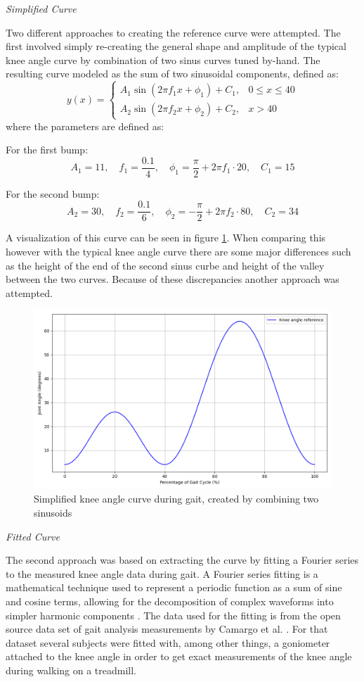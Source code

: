 \textit{Simplified Curve}

Two different approaches to creating the reference curve were attempted. The first involved simply re-creating the general shape and amplitude of the typical knee angle curve by combination of two sinus curves tuned by-hand. The resulting curve modeled as the sum of two sinusoidal components, defined as:
\[
y(x) =
\begin{cases}
A_1 \sin\left(2 \pi f_1 x + \phi_1\right) + C_1, & 0 \leq x \leq 40 \\
A_2 \sin\left(2 \pi f_2 x + \phi_2\right) + C_2, & x > 40
\end{cases}
\]
where the parameters are defined as:

For the first bump:
\[
A_1 = 11, \quad f_1 = \frac{0.1}{4}, \quad \phi_1 = \frac{\pi}{2} + 2\pi f_1 \cdot 20, \quad C_1 = 15
\]

For the second bump:
\[
A_2 = 30, \quad f_2 = \frac{0.1}{6}, \quad \phi_2 = -\frac{\pi}{2} + 2\pi f_2 \cdot 80, \quad C_2 = 34
\]


A visualization of this curve can be seen in figure \ref{fig:simplecurve}. When comparing this however with the typical knee angle curve there are some major differences such as the height of the end of the second sinus curbe and height of the valley between the two curves. Because of these discrepancies another approach was attempted.
\begin{figure} [h]
    \centering
    \includegraphics[width=0.8\linewidth]{images/simpleKneeAngle.png}
    \caption{Simplified knee angle curve during gait, created by combining two sinusoids}
    \label{fig:simplecurve}
\end{figure}
\textit{Fitted Curve}

The second approach was based on extracting the curve by fitting a Fourier series to the measured knee angle data during gait. A Fourier series fitting is a mathematical technique used to represent a periodic function as a sum of sine and cosine terms, allowing for the decomposition of complex waveforms into simpler harmonic components \cite{blackledget_chapter_2006}. The data used for the fitting is from the open source data set of gait analysis measurements by Camargo et al. \cite{camargo_comprehensive_2021}. For that dataset several subjects were fitted with, among other things, a goniometer attached to the knee angle in order to get exact measurements of the knee angle during walking on a treadmill. 

